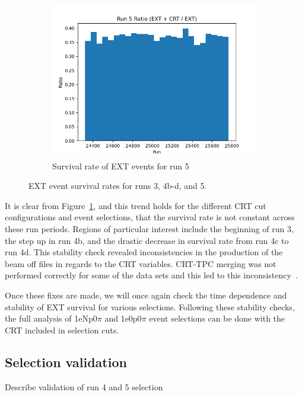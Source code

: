 \begin{figure}[H]
\begin{subfigure}[t]{0.3\linewidth}
        \includegraphics[width=\linewidth]{technote/EventSelections/FiguresCRT/run5fortalk.png}%
        \caption{Survival rate of EXT events for run 5}
    \end{subfigure}
    \caption{EXT event survival rates for runs 3, 4b-d, and 5. }
    \label{fig:EXT_survival_allruns}
\end{figure}

It is clear from Figure~\ref{fig:EXT_survival_allruns}, and this trend holds for the different CRT cut configurations and event selections, that the survival rate is not constant across these run periods. Regions of particular interest include the beginning of run 3, the step up in run 4b, and the drastic decrease in survival rate from run 4c to run 4d. This stability check revealed inconsistencies in the production of the beam off files in regards to the CRT variables. CRT-TPC merging was not performed correctly for some of the data sets and this led to this inconsistency~\cite{Herb's presentation}. 

Once these fixes are made, we will once again check the time dependence and stability of EXT survival for various selections. Following these stability checks, the full analysis of 1eNp0$\pi$ and 1e0p0$\pi$ event selections can be done with the CRT included in selection cuts.

\subsection{Selection validation}
\label{sec:selvalid}
Describe validation of run 4 and 5 selection

